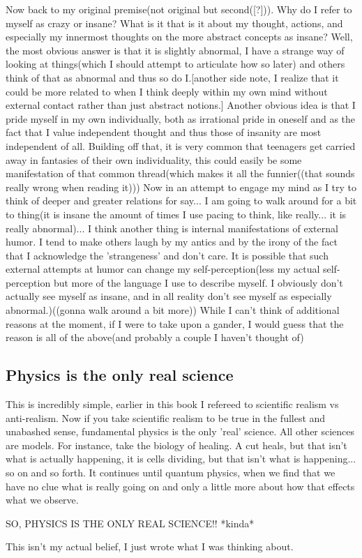 \par Now back to my original premise(not original but second([?])). Why do I refer to myself as crazy or insane? What is it that is it about my thought, actions, and especially my innermost thoughts on the more abstract concepts as insane? Well, the most obvious answer is that it is slightly abnormal, I have a strange way of looking at things(which I should attempt to articulate how so later) and others think of that as abnormal and thus so do I.[another side note, I realize that it could be more related to when I think deeply within my own mind without external contact rather than just abstract notions.] Another obvious idea is that I pride myself in my own individually, both as irrational pride in oneself and as the fact that I value independent thought and thus those of insanity are most independent of all. Building off that, it is very common that teenagers get carried away in fantasies of their own individuality, this could easily be some manifestation of that common thread(which makes it all the funnier((that sounds really wrong when reading it))) Now in an attempt to engage my mind as I try to think of deeper and greater relations for say... I am going to walk around for a bit to thing(it is insane the amount of times I use pacing to think, like really... it is really abnormal)... I think another thing is internal manifestations of external humor. I tend to make others laugh by my antics and by the irony of the fact that I acknowledge the 'strangeness' and don't care. It is possible that such external attempts at humor can change my self-perception(less my actual self-perception but more of the language I use to describe myself. I obviously don't actually see myself as insane, and in all reality don't see myself as especially abnormal.)((gonna walk around a bit more)) While I can't think of additional reasons at the moment, if I were to take upon a gander, I would guess that the reason is all of the above(and probably a couple I haven't thought of)


\subsection{Physics is the only real science}
\par This is incredibly simple, earlier in this book I refereed to scientific realism vs anti-realism. Now if you take scientific realism to be true in the fullest and unabashed sense, fundamental physics is the only 'real' science. All other sciences are models. For instance, take the biology of healing. A cut heals, but that isn't what is actually happening, it is cells dividing, but that isn't what is happening... so on and so forth. It continues until quantum physics, when we find that we have no clue what is really going on and only a little more about how that effects what we observe.
\par SO, PHYSICS IS THE ONLY REAL SCIENCE!! *kinda*
\par This isn't my actual belief, I just wrote what I was thinking about.
